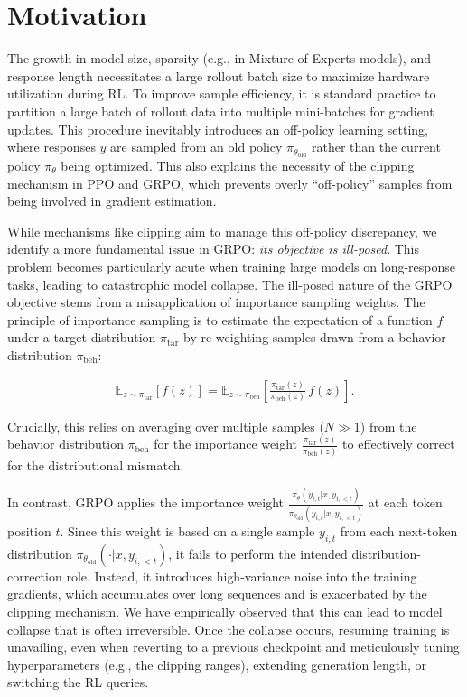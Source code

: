\section{Motivation}
\label{sec:motivation}

The growth in model size, sparsity (e.g., in Mixture-of-Experts models), and response length necessitates a large rollout batch size to maximize hardware utilization during RL. To improve sample efficiency, it is standard practice to partition a large batch of rollout data into multiple mini-batches for gradient updates. This procedure inevitably introduces an off-policy learning setting, where responses $y$ are sampled from an old policy $\pi_{\theta_\text{old}}$ rather than the current policy $\pi_\theta$ being optimized. This also explains the necessity of the clipping mechanism in PPO and GRPO, which prevents overly ``off-policy'' samples from being involved in gradient estimation.

While mechanisms like clipping aim to manage this off-policy discrepancy, we identify a more fundamental issue in GRPO: \textit{its objective is ill-posed}. This problem becomes particularly acute when training large models on long-response tasks, leading to catastrophic model collapse. The ill-posed nature of the GRPO objective stems from a misapplication of importance sampling weights. The principle of importance sampling is to estimate the expectation of a function $f$ under a target distribution $\pi_\text{tar}$ by re-weighting samples drawn from a behavior distribution $\pi_\text{beh}$:

\begin{align}
\mathbb{E}_{z \sim \pi_\text{tar}} \left[ f(z) \right] = \mathbb{E}_{z \sim \pi_\text{beh}} \left[ \frac{ \pi_\text{tar} (z) }{ \pi_\text{beh} (z)} \, f(z) \right].
\end{align}

Crucially, this relies on averaging over multiple samples ($N \gg 1$) from the behavior distribution $\pi_\text{beh}$ for the importance weight $\frac{ \pi_\text{tar} (z) }{ \pi_\text{beh} (z)}$ to effectively correct for the distributional mismatch.

In contrast, GRPO applies the importance weight $\frac{ \pi_{\theta} (y_{i,t} | x, y_{i,<t}) }{ \pi_{\theta_\text{old}} (y_{i,t} | x,y_{i,<t})}$ at each token position $t$. Since this weight is based on a single sample $y_{i,t}$ from each next-token distribution $\pi_{\theta_\text{old}}( \cdot | x, y_{i, <t})$, it fails to perform the intended distribution-correction role. Instead, it introduces high-variance noise into the training gradients, which accumulates over long sequences and is exacerbated by the clipping mechanism. We have empirically observed that this can lead to model collapse that is often irreversible. Once the collapse occurs, resuming training is unavailing, even when reverting to a previous checkpoint and meticulously tuning hyperparameters (e.g., the clipping ranges), extending generation length, or switching the RL queries.

